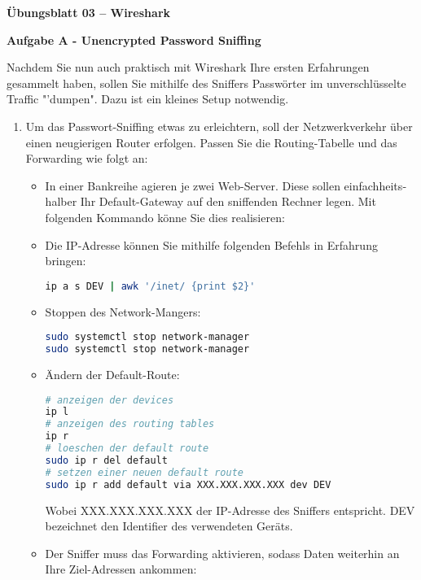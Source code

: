 \documentclass[paper=a4,fontsize=11pt]{scrartcl}%
\begin{document}
\begin{center}
\Large{\textbf{Übungsblatt 03 -- Wireshark}}\\
\end{center}


\begin{center}
\Large{\textbf{Aufgabe A - Unencrypted Password Sniffing}}
\end{center}\vskip0.25in

Nachdem Sie nun auch praktisch mit Wireshark Ihre ersten Erfahrungen gesammelt haben, sollen Sie mithilfe des Sniffers Passwörter im unverschlüsselte Traffic "'dumpen". Dazu ist ein kleines Setup notwendig.
\begin{enumerate}
	\item Um das Passwort-Sniffing etwas zu erleichtern, soll der Netzwerkverkehr über einen neugierigen Router erfolgen. Passen Sie die Routing-Tabelle und das Forwarding wie folgt an:
	\begin{itemize}
		\item In einer Bankreihe agieren je zwei Web-Server. Diese sollen ein­fach­heits­hal­ber Ihr Default-Gateway auf den sniffenden Rechner legen. Mit folgenden Kommando könne Sie dies realisieren:
		\item Die IP-Adresse können Sie mithilfe folgenden Befehls in Erfahrung bringen:
		\begin{lstlisting}[style=Bash, language=Bash]
ip a s DEV | awk '/inet/ {print $2}'
\end{lstlisting}
		\item Stoppen des Network-Mangers:
\begin{lstlisting}[style=Bash, language=Bash]
sudo systemctl stop network-manager
sudo systemctl stop network-manager
\end{lstlisting}		
		\item Ändern der Default-Route:
\begin{lstlisting}[style=Bash, language=Bash]
# anzeigen der devices
ip l
# anzeigen des routing tables
ip r
# loeschen der default route
sudo ip r del default
# setzen einer neuen default route
sudo ip r add default via XXX.XXX.XXX.XXX dev DEV
\end{lstlisting}
Wobei XXX.XXX.XXX.XXX der IP-Adresse des Sniffers entspricht. DEV bezeichnet den Identifier des verwendeten Geräts.
		\item Der Sniffer muss das Forwarding aktivieren, sodass Daten weiterhin an Ihre Ziel-Adressen ankommen:
\begin{lstlisting}[style=Bash, language=Bash]

\end{lstlisting}
\end{itemize}
\end{enumerate}
\end{document}
